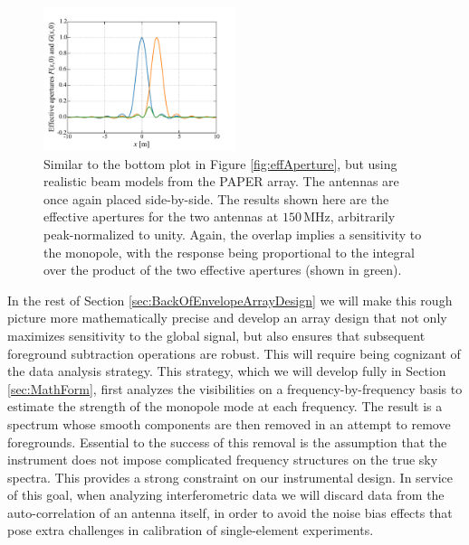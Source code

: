 \documentclass[twocolumn,apj,numberedappendix]{emulateapj}
\newcommand{\acl}[1]{{\color{red} \textbf{[ACL:  #1]}}}
\newcommand{\mep}[1]{{\color{applegreen} \textbf{[MEP:  #1]}}}
\begin{document}
\begin{figure}[h]
	\centering
	\includegraphics[width=0.50\textwidth]{figures/effAperture_PAPER.pdf}
	\caption{Similar to the bottom plot in Figure \ref{fig:effAperture}, but using realistic beam models from the PAPER array. The antennas are once again placed side-by-side. The results shown here are the effective apertures for the two antennas at $150\,\textrm{MHz}$, arbitrarily peak-normalized to unity. Again, the overlap implies a sensitivity to the monopole, with the response being proportional to the integral over the product of the two effective apertures (shown in green).}
	\label{fig:effAperture_PAPER}
\end{figure}

In the rest of Section \ref{sec:BackOfEnvelopeArrayDesign} we will make this rough picture more mathematically precise and develop an array design that not only maximizes sensitivity to the global signal, but also ensures that subsequent foreground subtraction operations are robust. This will require being cognizant of the data analysis strategy. This strategy, which we will develop fully in Section \ref{sec:MathForm}, first analyzes the visibilities on a frequency-by-frequency basis to estimate the strength of the monopole mode at each frequency. The result is a spectrum whose smooth components are then removed in an attempt to remove foregrounds. Essential to the success of this removal is the assumption that the instrument does not impose complicated frequency structures on the true sky spectra. This provides a strong constraint on our instrumental design. In service of this goal, when analyzing interferometric data we will discard data from the auto-correlation of an antenna itself, in order to avoid the noise bias effects that pose extra challenges in calibration of single-element experiments.
\end{document}
